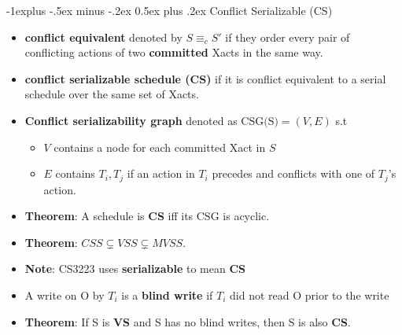 \documentclass[9pt, landscape]{extarticle}
\makeatletter
\renewcommand{\subsection}{\@startsection{subsection}{2}{0mm}%
  {-1explus -.5ex minus -.2ex}%
  {0.5ex plus .2ex}%
{\normalfont\normalsize\bfseries}}
\makeatother
\begin{document}
\begin{multicols*}{4}
  \subsection{Conflict Serializable (CS)}
  \begin{itemize}
    \item \textbf{conflict equivalent} denoted by $S \equiv_c S'$ if they order every pair of conflicting actions of two \textbf{committed} Xacts in the same way.
    \item \textbf{conflict serializable schedule (CS)} if it is conflict equivalent to a serial schedule over the same set of Xacts.
    \item \textbf{Conflict serializability graph} denoted as $\text{CSG(S)} = (V, E)$ s.t
    \begin{itemize}
      \item $V$ contains a node for each committed Xact in $S$
      \item $E$ contains $T_i, T_j$ if an action in $T_i$ precedes and conflicts with one of $T_j$'s action.
    \end{itemize}
    \item \textbf{Theorem}: A schedule is \textbf{CS} iff its $\text{CSG}$ is acyclic.
    \item \textbf{Theorem}: $CSS \subsetneq VSS \subsetneq MVSS$.
    \item \textbf{Note}: CS3223 uses \textbf{serializable} to mean \textbf{CS}
    \item A write on O by $T_i$ is a \textbf{blind write} if $T_i$ did not read O prior to the write
    \item \textbf{Theorem}: If S is \textbf{VS} and S has no blind writes, then S is also \textbf{CS}.
  \end{itemize}


\end{multicols*}
\end{document}
